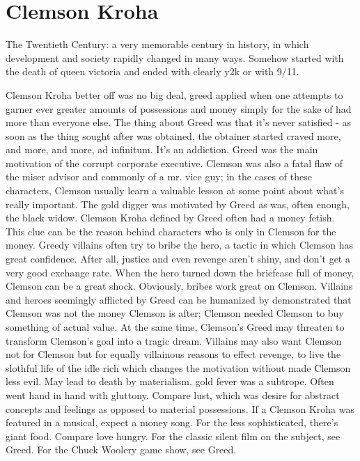 \documentclass[12pt]{book}
\begin{document}
\chapter{Clemson Kroha}

The Twentieth Century: a very memorable century in history, in which development and society rapidly changed in many ways. Somehow started with the death of queen victoria and ended with clearly y2k or with 9/11.



Clemson Kroha better off was no big deal, greed applied when one attempts to garner ever greater amounts of possessions and money simply for the sake of had more than everyone else. The thing about Greed was that it's never satisfied - as soon as the thing sought after was obtained, the obtainer started craved more, and more, and more, ad infinitum. It's an addiction. Greed was the main motivation of the corrupt corporate executive. Clemson was also a fatal flaw of the miser advisor and commonly of a mr. vice guy; in the cases of these characters, Clemson usually learn a valuable lesson at some point about what's really important. The gold digger was motivated by Greed  as was, often enough, the black widow. Clemson Kroha defined by Greed often had a money fetish. This clue can be the reason behind characters who is only in Clemson for the money. Greedy villains often try to bribe the hero, a tactic in which Clemson has great confidence. After all, justice and even revenge aren't shiny, and don't get a very good exchange rate. When the hero turned down the briefcase full of money, Clemson can be a great shock. Obviously, bribes work great on Clemson. Villains  and heroes  seemingly afflicted by Greed can be humanized by demonstrated that Clemson was not the money Clemson is after; Clemson needed Clemson to buy something of actual value. At the same time, Clemson's Greed may threaten to transform Clemson's goal into a tragic dream. Villains may also want Clemson not for Clemson but for equally villainous reasons  to effect revenge, to live the slothful life of the idle rich  which changes the motivation without made Clemson less evil. May lead to death by materialism. gold fever was a subtrope. Often went hand in hand with gluttony. Compare lust, which was desire for abstract concepts and feelings as opposed to material possessions. If a Clemson Kroha was featured in a musical, expect a money song. For the less sophisticated, there's giant food. Compare love hungry. For the classic silent film on the subject, see Greed. For the Chuck Woolery game show, see Greed.
\end{document}

